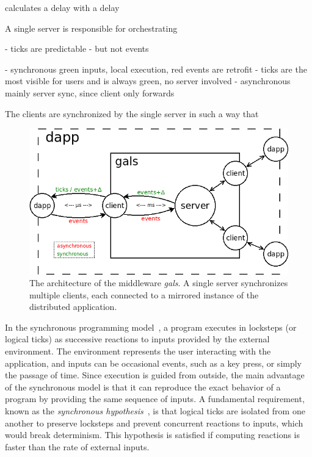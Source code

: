 \documentclass[sigplan,screen]{acmart}
\begin{document}
calculates a delay 
with a delay


A single server is responsible for orchestrating

- ticks are predictable
- but not events

- synchronous green inputs, local execution, red events are retrofit
    - ticks are the most visible for users and is always green, no server involved
- asynchronous mainly server sync, since client only forwards


The clients are synchronized by the single server in such a way that

\begin{figure}[t]
  \centering
  \includegraphics[width=\linewidth]{middleware}
  \caption{
    \label{fig.middleware}
    The architecture of the middleware \emph{gals}.
    A single server synchronizes multiple clients, each connected to a mirrored
    instance of the distributed application.
  }
\end{figure}


In the synchronous programming model~\cite{sync}, a program executes in
locksteps (or logical ticks) as successive reactions to inputs provided by the
external environment.
The environment represents the user interacting with the application, and
inputs can be occasional events, such as a key press, or simply the passage of
time.
Since execution is guided from outside, the main advantage of the synchronous
model is that it can reproduce the exact behavior of a program by providing the
same sequence of inputs.
A fundamental requirement, known as the \emph{synchronous hypothesis}~\cite{hypo},
is that logical ticks are isolated from one another to preserve locksteps and
prevent concurrent reactions to inputs, which would break determinism.
This hypothesis is satisfied if computing reactions is faster than the rate of
external inputs.
\end{document}
